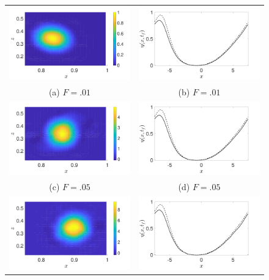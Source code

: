 \documentclass[a4paper,11pt]{article}
\begin{document}
\begin{figure}
\centering
\begin{tabular}{cc}
\includegraphics[width=.45\textwidth]{vorticity_wm_1_modu_pt9} & \includegraphics[width=.45\textwidth]{profiles_wm_1_modu_pt9}\\
(a)  $F=.01$ & (b)  $F=.01$\\
\includegraphics[width=.45\textwidth]{vorticity_wm_5_modu_pt9} & \includegraphics[width=.45\textwidth]{profiles_wm_5_modu_pt9}\\
(c)  $F=.05$ & (d)  $F=.05$\\
\includegraphics[width=.45\textwidth]{vorticity_wm_10_modu_pt9} & \includegraphics[width=.45\textwidth]{profiles_wm_10_modu_pt9}\\

\end{tabular}
\end{figure}
\end{document}
